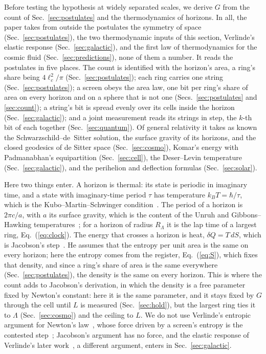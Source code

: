 \documentclass[aps,prd,twocolumn,superscriptaddress,nofootinbib,showkeys]{revtex4-2}
\makeatletter
\newcommand{\lc}{\ell_c}
\newcommand{\RL}{R_\Lambda}
\def\section{\@startsection{section}{1}{\z@}{0.6cm \@plus1ex \@minus .2ex}{0.35cm}{\normalfont\small\bfseries}}
\makeatother
\begin{document}
\section{Newton's Constant from the Count}
\label{sec:count}

Before testing the hypothesis at widely separated scales, we derive $G$ from the count of Sec.~\ref{sec:postulates} and the thermodynamics of horizons. In all, the paper takes from outside the postulates the symmetry of space (Sec.~\ref{sec:postulates}), the two thermodynamic inputs of this section, Verlinde's elastic response (Sec.~\ref{sec:galactic}), and the first law of thermodynamics for the cosmic fluid (Sec.~\ref{sec:predictions}), none of them a number. It reads the postulates in five places. The count is identified with the horizon's area, a ring's share being $4\lc^2/\pi$ (Sec.~\ref{sec:postulates}); each ring carries one string (Sec.~\ref{sec:postulates}); a screen obeys the area law, one bit per ring's share of area on every horizon and on a sphere that is not one (Secs.~\ref{sec:postulates} and \ref{sec:count}); a string's bit is spread evenly over its cells inside the horizon (Sec.~\ref{sec:galactic}); and a joint measurement reads its strings in step, the $k$-th bit of each together (Sec.~\ref{sec:quantum}). Of general relativity it takes as known the Schwarzschild--de~Sitter solution, the surface gravity of its horizons, and the closed geodesics of de Sitter space (Sec.~\ref{sec:cosmo}), Komar's energy with Padmanabhan's equipartition (Sec.~\ref{sec:cell}), the Deser--Levin temperature (Sec.~\ref{sec:galactic}), and the perihelion and deflection formulas (Sec.~\ref{sec:solar}).

Here two things enter. A horizon is thermal: its state is periodic in imaginary time, and a state with imaginary-time period $\tau$ has temperature $k_BT = \hbar/\tau$, which is the Kubo--Martin--Schwinger condition~\cite{kubo1957}. The period of a horizon is $2\pi c/a$, with $a$ its surface gravity, which is the content of the Unruh and Gibbons--Hawking temperatures~\cite{unruh1976,gibbons1977}; for a horizon of radius $\RL$ it is the lap time of a largest ring, Eq.~(\ref{eq:clock}). The energy that crosses a horizon is heat, $\delta Q = T\,dS$, which is Jacobson's step~\cite{jacobson1995}. He assumes that the entropy per unit area is the same on every horizon; here the entropy comes from the register, Eq.~(\ref{eq:S}), which fixes that density, and since a ring's share of area is the same everywhere (Sec.~\ref{sec:postulates}), the density is the same on every horizon. This is where the count adds to Jacobson's derivation, in which the density is a free parameter fixed by Newton's constant: here it is the same parameter, and it stays fixed by $G$ through the cell until $L$ is measured (Sec.~\ref{sec:hold}), but the largest ring ties it to $\Lambda$ (Sec.~\ref{sec:cosmo}) and the ceiling to $L$. We do not use Verlinde's entropic argument for Newton's law~\cite{verlinde2011}, whose force driven by a screen's entropy is the contested step~\cite{visser2011}; Jacobson's argument has no force, and the elastic response of Verlinde's later work~\cite{verlinde2017}, a different argument, enters in Sec.~\ref{sec:galactic}.
\end{document}
